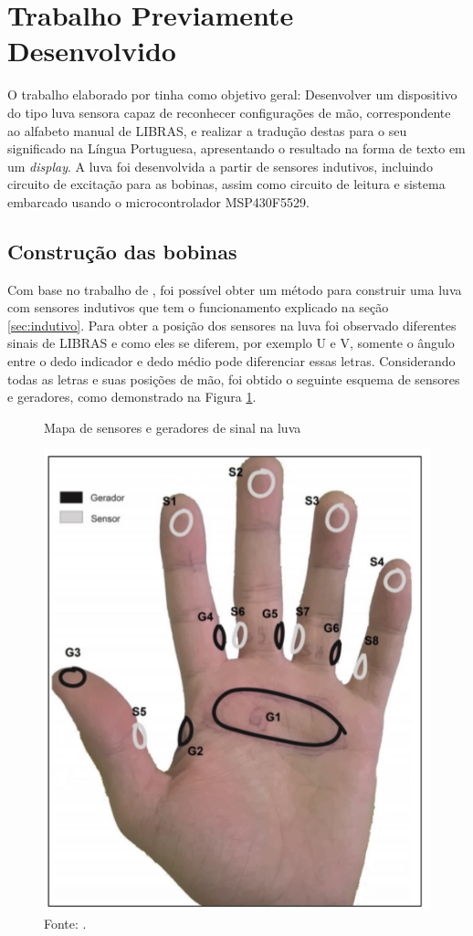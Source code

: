 \section{Trabalho Previamente Desenvolvido}
O trabalho elaborado por  tinha como objetivo geral: Desenvolver um dispositivo do tipo luva sensora capaz de 
reconhecer configurações de mão, correspondente ao alfabeto manual de LIBRAS, e realizar a tradução destas para o seu significado 
na Língua Portuguesa, apresentando o resultado na forma de texto em um \textit{display}. A luva foi desenvolvida a partir de sensores indutivos, incluindo circuito de excitação
para as bobinas, assim como circuito de leitura e sistema embarcado usando o 
microcontrolador MSP430F5529.

\subsection{Construção das bobinas}
Com base no trabalho de , foi possível obter um método para construir uma luva com sensores indutivos 
que tem o funcionamento explicado na seção \ref{sec:indutivo}. 	
Para obter a posição dos sensores na luva foi observado diferentes sinais de LIBRAS e como eles se diferem, por exemplo U e V, 
somente o ângulo entre o dedo indicador e dedo médio pode diferenciar essas letras. Considerando todas as letras e suas posições 
de mão, foi obtido o seguinte esquema de sensores e geradores, como demonstrado na Figura \ref{fig:disposicaoSensores}.

	\begin{figure}[H]
		\vspace{4mm}
		\centering
		\caption{Mapa de sensores e geradores de sinal na luva}
		\label{fig:disposicaoSensores}
		\includegraphics[scale=0.5]{imagens/SensoresMao.png}		
		\caption*{Fonte: .}		
	\end{figure}
	
